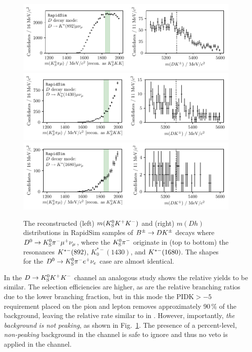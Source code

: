 \begin{figure}[tbp]
    \centering
    \includegraphics[width=0.8\columnwidth]{figures/analysis/background_checks/semilep_D_mu_892_KsKK.pdf}
    \includegraphics[width=0.8\columnwidth]{figures/analysis/background_checks/semilep_D_mu_1430_KsKK.pdf}
    \includegraphics[width=0.8\columnwidth]{figures/analysis/background_checks/semilep_D_mu_1680_KsKK.pdf}
    \caption{The reconstructed (left) $m({{K}^0_{\mathrm{S}}} K^+ K^-)$ and (right) $m(Dh)$ distributions in RapidSim samples of ${{B}^\pm}\rightarrow{\ensuremath{D}} {\ensuremath{{K}^\pm}}$ decays where ${{D}^0}\rightarrow{\ensuremath{{K}^0_{\mathrm{S}}}}\pi^-\mu^+\nu_\mu$, where the ${{K}^0_{\mathrm{S}}}{{\pi}^-}$ originate in (top to bottom) the resonances ${{K}^{*-}}(892)$, $K^{*-}_0(1430)$, and ${{K}^{*-}}(1680)$. The shapes for the ${{D}^0}\rightarrow{\ensuremath{{K}^0_{\mathrm{S}}}}\pi^-e^+\nu_e$ case are almost identical.}
    \label{fig:semileptonic_D_decays_kskk}
\end{figure}


In the ${D}\rightarrow{\ensuremath{{K}^0_{\mathrm{S}}}}{\ensuremath{{K}^+}}{\ensuremath{{K}^-}}$ channel an analogous study shows the relative yields to be similar. The selection efficiencies are higher, as are the relative branching ratios due to the lower \DtoKskk branching fraction, but in this mode the $\text{PIDK}>-5$ requirement placed on the pion and lepton removes approximately 90\,\% of the background, leaving the relative rate similar to in \DtoKspipi. However, importantly, \emph{the background is not peaking}, as shown in Fig.~\ref{fig:semileptonic_D_decays_kskk}. The presence of a percent-level, \emph{non-peaking} background in the \DtoKskk channel is safe to ignore and thus no veto is applied in the \DtoKskk channel.

